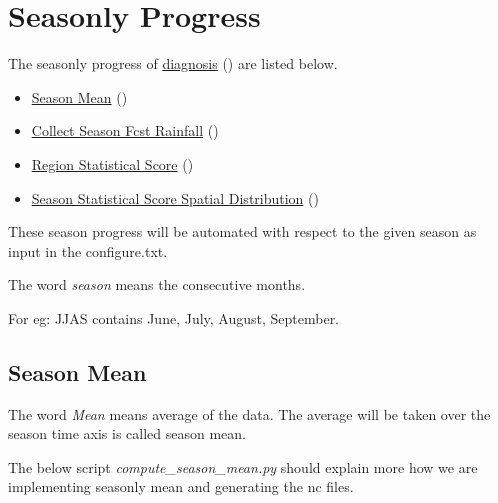 \documentclass[letterpaper,10pt,english]{sphinxmanual}
\begin{document}
\section{Seasonly Progress}
\label{diagnosis:seasonly-progress}
The seasonly progress of {\hyperref[diagnosis:diagnosis]{diagnosis}} () are listed below.
\begin{itemize}
\item {} 
{\hyperref[diagnosis:season-mean]{Season Mean}} ()

\item {} 
{\hyperref[diagnosis:collect-season-fcst-rainfall]{Collect Season Fcst Rainfall}} ()

\item {} 
{\hyperref[diagnosis:region-statistical-score]{Region Statistical Score}} ()

\item {} 
{\hyperref[diagnosis:season-statistical-score-spatial-distribution]{Season Statistical Score Spatial Distribution}} ()

\end{itemize}

These season progress will be automated with respect to the given season as input in the configure.txt.

The word \emph{season} means the consecutive months.

For eg: JJAS contains June, July, August, September.


\subsection{Season Mean}
\label{diagnosis:season-mean}
The word \emph{Mean} means average of the data. The average will be taken over the season time axis is called season mean.

The below script \emph{compute\_season\_mean.py} should explain more how we are implementing seasonly mean and generating the nc files.
\label{diagnosis:module-compute_season_mean}\label{diagnosis:module-compute_season_mean.py}
\end{document}
